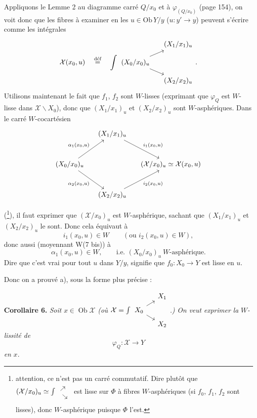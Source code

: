 \documentclass[11pt]{article}
\newcommand{\printedpage}[1]{\marginpar{\footnotesize p.~#1}}
\newcommand{\msp}[1]{\marginpar{\footnotesize [#1]}}
\newcommand{\intdiag}[3]{\int\begin{tikzcd}[row sep=small,column sep=small,ampersand replacement=\&,baseline=(\tikzcdmatrixname-2-1.base)] \& #2 \\ #1 \arrow[ur]\arrow[dr] \& \\ \& #3 \end{tikzcd}}
\newcommand{\Ob}{\operatorname{Ob}}
\begin{document}
Appliquons le Lemme 2 au diagramme carré $Q/x_0$ et à $\varphi_{(Q/x_0)}$ (page 154), on voit donc que les fibres à examiner en les $u\in\mathrm{Ob}\,Y/y$ ($u : y'\longrightarrow y$) peuvent s'écrire comme les intégrales
\[
\mathcal{X}(x_0,u) \quad\overset{\text{déf}}{=}\quad \intdiag{(X_0/x_0)_u}{(X_1/x_1)_u}{(X_2/x_2)_u} .
\]
Utilisons maintenant le fait que $f_1$, $f_2$ sont $W$-lisses (exprimant que $\varphi_Q$ est $W$-lisse dans $\mathcal{X}\backslash X_0$), donc que $(X_1/x_1)_u$ et $(X_2/x_2)_u$ sont $W$-asphériques. Dans le carré $W$-cocartésien
\[
\begin{tikzcd}[row sep=large,column sep=small]
 & (X_1/x_1)_u \arrow[dr, "{i_1(x_0,u)}"] & \\
(X_0/x_0)_u \arrow[ur, "{\alpha_1(x_0,u)}"] \arrow[dr, "{\alpha_2(x_0,u)}"'] & & (\mathcal{X}/x_0)_u\simeq\mathcal{X}(x_0,u) \\
 & (X_2/x_2)_u \arrow[ur, "{i_2(x_0,u)}"'] &
\end{tikzcd}
\]

\printedpage{108}
(\footnote[107]{attention, ce n'est pas un carré commutatif. Dire plutôt que $(\mathcal{X}/x_0)_u \simeq \int \begin{tikzcd}[ampersand replacement=\&, row sep=0.4em, column sep=0.4em, baseline=(\tikzcdmatrixname-2-1.base)] \& {} \\ {} \ar[ur]\ar[dr] \& \\ \& {} \end{tikzcd}$ est lisse sur $\Phi$ à fibres $W$-asphériques (si $f_0$, $f_1$, $f_2$ sont lisses), donc $W$-asphérique puisque $\Phi$ l'est.}), il faut exprimer que $(\mathcal{X}/x_0)_u$ est $W$-asphérique, sachant que $(X_1/x_1)_u$ et $(X_2/x_2)_u$ le sont. Donc cela équivaut à %
\[
i_1(x_0,u) \in W \qquad (\text{ou } i_2(x_0,u) \in W),
\]
donc aussi (moyennant W(7 bis)) à
\msp{page 157}
\[
\alpha_1(x_0,u) \in W, \qquad \text{i.e. } (X_0/x_0)_u \ W\text{-asphérique.}
\]
Dire que c'est vrai pour tout $u$ dans $Y/y$, signifie que $f_0 : X_0 \longrightarrow Y$ est lisse en $u$.

Donc on a prouvé a), sous la forme plus précise :

\textbf{Corollaire 6.} \textit{Soit $x \in \Ob \mathcal{X}$ (où $\mathcal{X} = \int \begin{tikzcd}[ampersand replacement=\&, row sep=tiny, column sep=small, baseline=(\tikzcdmatrixname-2-1.base)] \& X_1 \\ X_0 \ar[ur]\ar[dr] \& \\ \& X_2 \end{tikzcd}$.) On veut exprimer la $W$-lissité de}
\[
\varphi_Q : \mathcal{X} \longrightarrow Y
\]
\textit{en $x$.}
\end{document}
